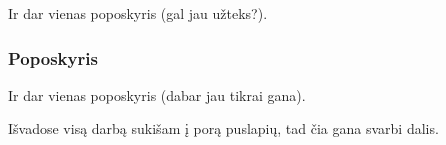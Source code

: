 \documentclass{VUMIFInfKursinis}
\begin{document}
Ir dar vienas poposkyris (gal jau užteks?).

\subsubsection{Poposkyris}

Ir dar vienas poposkyris (dabar jau tikrai gana).


Išvadose visą darbą sukišam į porą puslapių, tad čia gana svarbi dalis.

\printbibliography[heading=bibintoc] %

\end{document}
